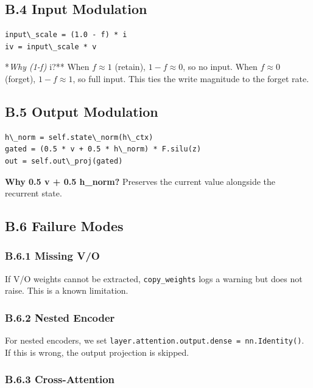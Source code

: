 \subsection{B.4 Input Modulation}

\begin{lstlisting}
input\_scale = (1.0 - f) * i
iv = input\_scale * v
\end{lstlisting}

*\textit{Why (1-f) } i?** When $f \approx 1$ (retain), $1 - f \approx 0$, so no 
input. When $f \approx 0$ (forget), $1 - f \approx 1$, so full input. This 
ties the write magnitude to the forget rate.

\subsection{B.5 Output Modulation}

\begin{lstlisting}
h\_norm = self.state\_norm(h\_ctx)
gated = (0.5 * v + 0.5 * h\_norm) * F.silu(z)
out = self.out\_proj(gated)
\end{lstlisting}

\textbf{Why 0.5 v + 0.5 h\_norm?} Preserves the current value alongside the 
recurrent state.

\subsection{B.6 Failure Modes}

\subsubsection{B.6.1 Missing V/O}

If V/O weights cannot be extracted, \texttt{copy\_weights} logs a warning but does 
not raise. This is a known limitation.

\subsubsection{B.6.2 Nested Encoder}

For nested encoders, we set \texttt{layer.attention.output.dense = nn.Identity()}. 
If this is wrong, the output projection is skipped.

\subsubsection{B.6.3 Cross-Attention}

